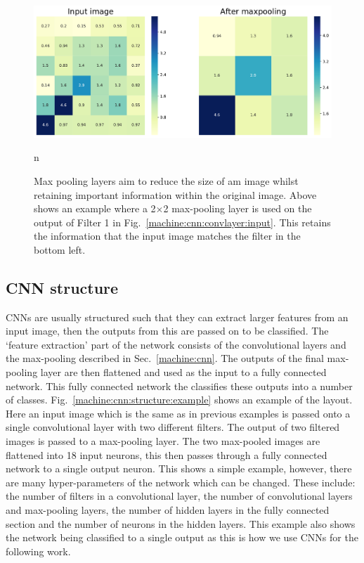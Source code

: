 \begin{figure}[h]
    \centering
    \includegraphics[width=\columnwidth]{C4_cnn/maxpool.pdf}
    \caption[How max pooling layers are applied in \glspl{CNN}.]{Max pooling layers aim to reduce the size of am image whilst retaining important information within the original image. Above shows an example where a 2$\times$2 max-pooling layer is used on the output of Filter 1 in Fig.~\ref{machine:cnn:convlayer:input}. This retains the information that the input image matches the filter in the bottom left.}n
    \label{machine:cnn:maxpool:image}
\end{figure}

\subsection{CNN structure}

\glspl{CNN} are usually structured such that they can extract larger features from an input image, then the outputs from this are passed on to be classified.
The `feature extraction' part of the network consists of the convolutional layers and the max-pooling described in Sec.~\ref{machine:cnn}.
The outputs of the final max-pooling layer are then flattened and used as the input to a fully connected network.
This fully connected network the classifies these outputs into a number of classes.
Fig.~\ref{machine:cnn:structure:example} shows an example of the layout. 
Here an input image which is the same as in previous examples is passed onto a single convolutional layer with two different filters.
The output of two filtered images is passed to a max-pooling layer.
The two max-pooled images are flattened into 18 input neurons, this then passes through a fully connected network to a single output neuron.
This shows a simple example, however, there are many hyper-parameters of the network which can be changed.
These include: the number of filters in a convolutional layer, the number of convolutional layers and max-pooling layers, the number of hidden layers in the fully connected section and the number of neurons in the hidden layers. 
This example also shows the network being classified to a single output as this is how we use \glspl{CNN} for the following work.

